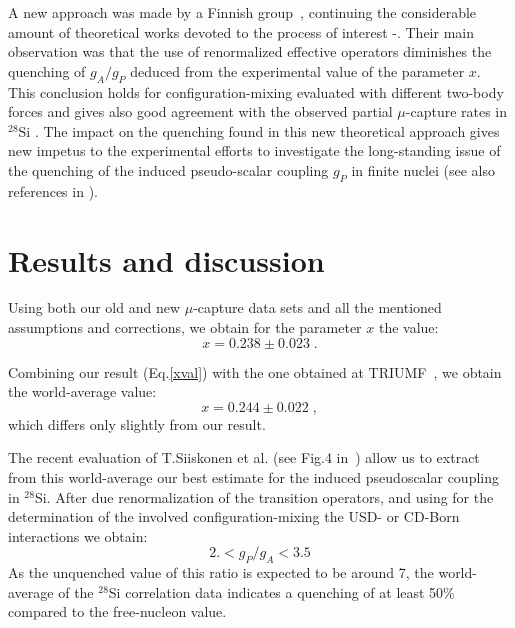 A new approach was made by a Finnish
group~\cite{Siiskonen98,Siiskonen98_2}, 
continuing the considerable amount of theoretical works
devoted to the process of interest \cite{Fujii59}-\cite{BKOT94}. Their
main
observation was that the use of renormalized effective operators
diminishes the
quenching of $g_A/g_P$ deduced from the experimental value of the
parameter $x$.
This conclusion holds for configuration-mixing evaluated with different
two-body
forces and 
gives also good agreement 
with the observed partial $\mu$-capture rates
in $^{28}$Si \cite{Siiskonen98_2}. 
The impact on the quenching found in this new theoretical approach
gives new impetus
to the experimental efforts to investigate the long-standing issue of
the quenching
of the induced pseudo-scalar coupling $g_P$ in finite nuclei (see also
references
in \cite{WEIN95,Brudanin95,Moftah97,Siiskonen98}).


\section{Results and discussion} 

Using both our old and new $\mu$-capture data sets and all the mentioned
assumptions
and corrections, we obtain for the parameter $x$ the value:
\begin{equation} \label{xval}
  x = 0.238 \pm 0.023 \;.
\end{equation}

Combining our result (Eq.\ref{xval}) with the one obtained at
TRIUMF~\cite{Moftah97},
we obtain the world-average value:
\begin{equation} \label{xsum}
  x = 0.244 \pm 0.022 \; ,
\end{equation}
which differs only slightly from our result.

The recent evaluation of T.Siiskonen et al. (see Fig.4
in~\cite{Siiskonen98}) allow
us to extract from this world-average our best estimate for the induced
pseudoscalar
coupling in $^{28}$Si. After due renormalization of the transition
operators, and
using for the determination of the involved configuration-mixing the
USD- or CD-Born
interactions we obtain:
\begin{equation} \label{gpga}
   2. < g_P/g_A < 3.5
\end{equation}
As the unquenched value of this ratio is expected to be around 7, the 
world-average of the $^{28}$Si correlation data indicates
a quenching of at least 50\% compared to the free-nucleon value.


